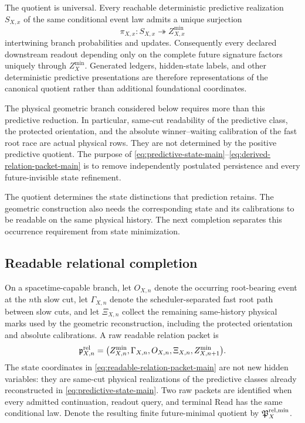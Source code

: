 \documentclass[11pt]{article}
\numberwithin{equation}{section}
\theoremstyle{definition}
\theoremstyle{remark}
\begin{document}
The quotient is universal.  Every reachable deterministic predictive
realization $S_{X,x}$ of the same conditional event law admits a unique
surjection
\begin{equation}
 \pi_{X,x}:S_{X,x}\twoheadrightarrow Z_{X,x}^{\min}
 \label{eq:predictive-universal-main}
\end{equation}
intertwining branch probabilities and updates.  Consequently every declared
downstream readout depending only on the complete future signature factors
uniquely through $Z_X^{\min}$.  Generated ledgers, hidden-state labels, and
other deterministic predictive presentations are therefore representations of
the canonical quotient rather than additional foundational coordinates.

The physical geometric branch considered below requires more than this
predictive reduction.  In particular, same-cut readability of the predictive
class, the protected orientation, and the absolute winner--waiting calibration
of the fast root race are actual physical rows.  They are not determined by
the positive predictive quotient.  The purpose of
\eqref{eq:predictive-state-main}--\eqref{eq:derived-relation-packet-main} is to
remove independently postulated persistence and every future-invisible state
refinement.

The quotient determines the state distinctions that prediction retains.
The geometric construction also needs the corresponding state and its
calibrations to be readable on the same physical history. The next
completion separates this occurrence requirement from state minimization.

\subsection{Readable relational completion}

On a spacetime-capable branch, let $O_{X,n}$ denote the occurring root-bearing
event at the $n$th slow cut, let $\Gamma_{X,n}$ denote the scheduler-separated
fast root path between slow cuts, and let $\Xi_{X,n}$ collect the remaining
same-history physical marks used by the geometric reconstruction, including the
protected orientation and absolute calibrations.  A raw readable relation
packet is
\begin{equation}
 \mathfrak p_{X,n}^{\rm rel}
 =\bigl(
 Z_{X,n}^{\min},\Gamma_{X,n},O_{X,n},\Xi_{X,n},Z_{X,n+1}^{\min}
 \bigr).
 \label{eq:readable-relation-packet-main}
\end{equation}
The state coordinates in \eqref{eq:readable-relation-packet-main} are not new
hidden variables: they are same-cut physical realizations of the predictive
classes already reconstructed in \eqref{eq:predictive-state-main}.  Two raw
packets are identified when every admitted continuation, readout query, and
terminal Read has the same conditional law.  Denote the resulting finite
future-minimal quotient by $\mathfrak P_X^{\rm rel,min}$.
\end{document}
